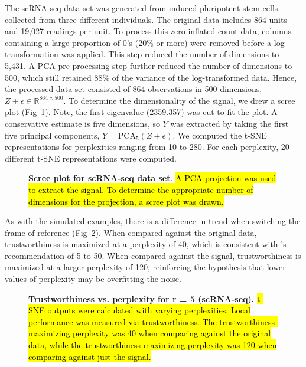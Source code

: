 \documentclass[10pt,letterpaper]{article}
\begin{document}
The scRNA-seq data set was generated from induced pluripotent stem cells collected from three different individuals. The original data includes 864 units and 19,027 readings per unit. To process this zero-inflated count data, columns containing a large proportion of 0's (20\% or more) were removed before a log transformation was applied. This step reduced the number of dimensions to 5,431. A PCA pre-processing step further reduced the number of dimensions to 500, which still retained 88\% of the variance of the log-transformed data. Hence, the processed data set consisted of 864 observations in 500 dimensions, $Z + \epsilon \in \mathbb{R}^{864 \times 500}$. To determine the dimensionality of the signal, we drew a scree plot (Fig~\ref{fig9}). Note, the first eigenvalue (2359.357) was cut to fit the plot. A conservative estimate is five dimensions, so $Y$ was extracted by taking the first five principal components, $Y = \textrm{PCA}_5(Z + \epsilon)$. We computed the t-SNE representations for perplexities ranging from 10 to 280. For each perplexity, 20 different t-SNE representations were computed.

\begin{figure}[!h]
\caption{{\bf Scree plot for scRNA-seq data set}.
\hl{A PCA projection was used to extract the signal. To determine the appropriate number of dimensions for the projection, a scree plot was drawn.}}
\label{fig9}
\end{figure}

As with the simulated examples, there is a difference in trend when switching the frame of reference (Fig~\ref{fig10}). When compared against the original data, trustworthiness is maximized at a perplexity of 40, which is consistent with \cite{t-SNE}'s recommendation of 5 to 50. When compared against the signal, trustworthiness is maximized at a larger perplexity of 120, reinforcing the hypothesis that lower values of perplexity may be overfitting the noise.

\begin{figure}[!h]
\caption{{\bf Trustworthiness vs. perplexity for r = 5 (scRNA-seq).}
\hl{t-SNE outputs were calculated with varying perplexities. Local performance was measured via trustworthiness. The trustworthiness-maximizing perplexity was 40 when comparing against the original data, while the trustworthiness-maximizing perplexity was 120 when comparing against just the signal.}}
\label{fig10}
\end{figure}
\end{document}

